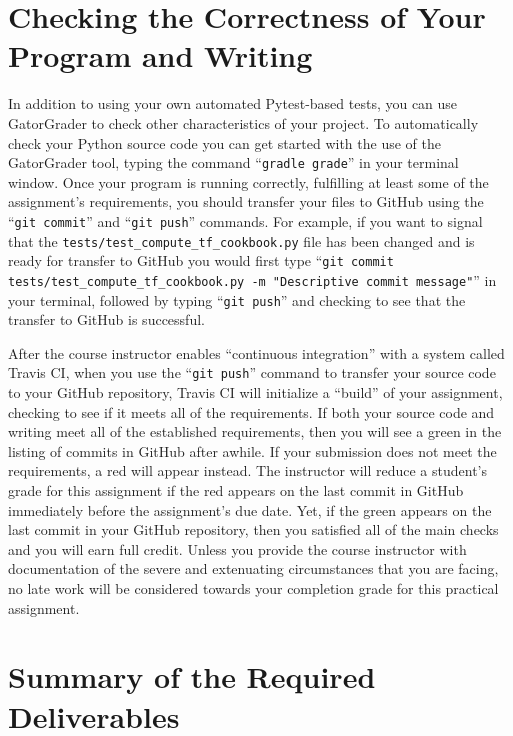 \documentclass[11pt]{article}
\newcommand{\testprogramsource}{\lstinline{tests/test_compute_tf_cookbook.py}}
\newcommand{\gatorgraderstart}{\command{gradle grade}}
\newcommand{\gitcommit}{\command{git commit}}
\newcommand{\gitpush}{\command{git push}}
\newcommand{\gitcommittestprogram}{\command{git commit tests/test_compute_tf_cookbook.py -m "Descriptive commit message"}}
\newcommand{\command}[1]{``\lstinline{#1}''}
\newcommand{\step}[1]{``{#1}''}
\newcommand{\checkmark}{\ding{51}}
\newcommand{\naughtmark}{\ding{55}}
\begin{document}
\section*{Checking the Correctness of Your Program and Writing}

In addition to using your own automated Pytest-based tests, you can use
GatorGrader to check other characteristics of your project. To automatically
check your Python source code you can get started with the use of the
GatorGrader tool, typing the command \gatorgraderstart{} in your terminal
window.
%
Once your program is running correctly, fulfilling at least some of the
assignment's requirements, you should transfer your files to GitHub using the
\gitcommit{} and \gitpush{} commands. For example, if you want to signal that
the \testprogramsource{} file has been changed and is ready for transfer to
GitHub you would first type \gitcommittestprogram{} in your terminal, followed
by typing \gitpush{} and checking to see that the transfer to GitHub is
successful.


After the course instructor enables \step{continuous integration} with a system
called Travis CI, when you use the \gitpush{} command to transfer your source
code to your GitHub repository, Travis CI will initialize a \step{build} of your
assignment, checking to see if it meets all of the requirements. If both your
source code and writing meet all of the established requirements, then you will
see a green \checkmark{} in the listing of commits in GitHub after awhile. If
your submission does not meet the requirements, a red \naughtmark{} will appear
instead. The instructor will reduce a student's grade for this assignment if the
red \naughtmark{} appears on the last commit in GitHub immediately before the
assignment's due date. Yet, if the green \checkmark{} appears on the last commit
in your GitHub repository, then you satisfied all of the main checks and you
will earn full credit. Unless you provide the course instructor with
documentation of the severe and extenuating circumstances that you are facing,
no late work will be considered towards your completion grade for this practical
assignment.

\section*{Summary of the Required Deliverables}
\end{document}

